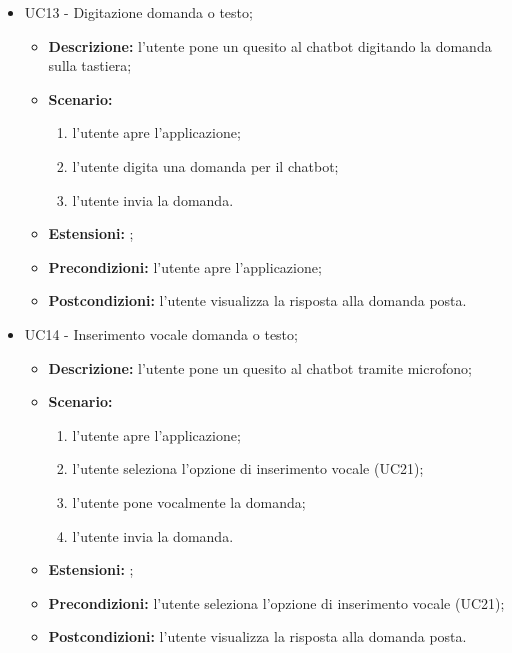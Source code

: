 \documentclass[10pt, a4paper]{article}
\begin{document}
\begin{itemize}
    \item UC13 - Digitazione domanda o testo;
    \begin{itemize}
        \item \textbf{Descrizione: }l'utente pone un quesito al chatbot digitando la domanda sulla tastiera;
        \item \textbf{Scenario: }
        \begin{enumerate}[label={\arabic*.}, align=left]
        \item l'utente apre l'applicazione;
        \item l'utente digita una domanda per il chatbot;
        \item l'utente invia la domanda.
        \end{enumerate}
        \item \textbf{Estensioni: };
        \item \textbf{Precondizioni:} l'utente apre l'applicazione;
        \item \textbf{Postcondizioni: }l'utente visualizza la risposta alla domanda posta.\\
    \end{itemize}
        
        \item UC14 - Inserimento vocale domanda o testo;
        \begin{itemize}
        \item \textbf{Descrizione: }l'utente pone un quesito al chatbot tramite microfono;
        \item \textbf{Scenario: }
        \begin{enumerate}[label={\arabic*.}, align=left]
        \item l'utente apre l'applicazione;
        \item l'utente seleziona l'opzione di inserimento vocale (UC21);
        \item l'utente pone vocalmente la domanda;
        \item l'utente invia la domanda.
        \end{enumerate}
        \item \textbf{Estensioni: };
        \item \textbf{Precondizioni:} l'utente seleziona l'opzione di inserimento vocale (UC21);
        \item \textbf{Postcondizioni: }l'utente visualizza la risposta alla domanda posta.\\
    \end{itemize}
    

\end{itemize}
\end{document}

